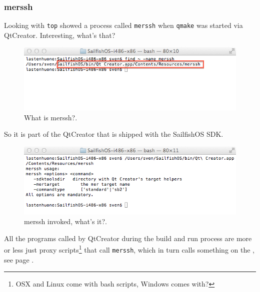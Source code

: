 \subsubsection{merssh}\label{subsubsec:merssh}
%
Looking with \verb,top, showed a process called \verb,merssh, when \verb,qmake, was started via QtCreator. Interesting, what's that?
%
\begin{figure}[H]
  \centering
  \includegraphics[scale=0.6]{../media/gfx/bash/merssh.png} 
  \caption{What is merssh?.}
  \label{fig:merssh}
\end{figure}
%
So it is part of the QtCreator that is shipped with the SailfishOS SDK.
%
\begin{figure}[H]
  \centering
  \includegraphics[scale=0.6]{../media/gfx/bash/mersshinvoked.png} 
  \caption{merssh invoked, what's it?.}
  \label{fig:mersshinvoked}
\end{figure}
%
All the programs called by QtCreator during the build and run process are more or less just proxy scripts\footnote{OSX and Linux come with bash scripts, Windows comes with?} that call \verb,merssh,, which in turn calls something on the , see page \pageref{subsec:MerSDK}.

